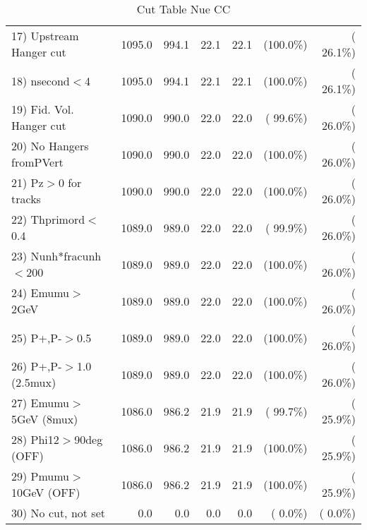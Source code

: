\begin{table}[h!]
\begin{tabular}{||l||r|r|r|r|r|r||}
 17) Upstream Hanger cut  &       1095.0 &        994.1 &         22.1 &         22.1 & (100.0\%) & ( 26.1\%) \\
 18) nsecond$<$4          &       1095.0 &        994.1 &         22.1 &         22.1 & (100.0\%) & ( 26.1\%) \\
 19) Fid. Vol. Hanger cut &       1090.0 &        990.0 &         22.0 &         22.0 & ( 99.6\%) & ( 26.0\%) \\
 20) No Hangers fromPVert &       1090.0 &        990.0 &         22.0 &         22.0 & (100.0\%) & ( 26.0\%) \\
 21) Pz$>$0 for tracks    &       1090.0 &        990.0 &         22.0 &         22.0 & (100.0\%) & ( 26.0\%) \\
 22) Thprimord$<$0.4      &       1089.0 &        989.0 &         22.0 &         22.0 & ( 99.9\%) & ( 26.0\%) \\
 23) Nunh*fracunh$<$200   &       1089.0 &        989.0 &         22.0 &         22.0 & (100.0\%) & ( 26.0\%) \\
 24) Emumu$>$2GeV         &       1089.0 &        989.0 &         22.0 &         22.0 & (100.0\%) & ( 26.0\%) \\
 25) P+,P-$>$0.5          &       1089.0 &        989.0 &         22.0 &         22.0 & (100.0\%) & ( 26.0\%) \\
 26) P+,P-$>$1.0 (2.5mux) &       1089.0 &        989.0 &         22.0 &         22.0 & (100.0\%) & ( 26.0\%) \\
 27) Emumu$>$5GeV  (8mux) &       1086.0 &        986.2 &         21.9 &         21.9 & ( 99.7\%) & ( 25.9\%) \\
 28) Phi12$>$90deg  (OFF) &       1086.0 &        986.2 &         21.9 &         21.9 & (100.0\%) & ( 25.9\%) \\
 29) Pmumu$>$10GeV  (OFF) &       1086.0 &        986.2 &         21.9 &         21.9 & (100.0\%) & ( 25.9\%) \\
 30) No cut, not set      &          0.0 &          0.0 &          0.0 &          0.0 & (  0.0\%) & (  0.0\%) \\
 \hline
 \hline
 \end{tabular}
 \caption{Cut Table   Nue CC  }
 \label{tab-cutheavy_neutrino_1.500}
 \end{table}
